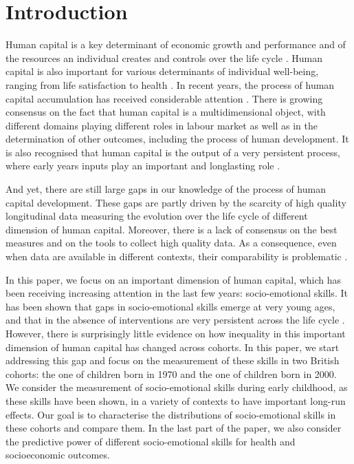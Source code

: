 \section{Introduction}

Human capital is a key determinant of economic growth and performance and of the resources an individual creates and controls over the life cycle \citep{hanushek2008role}. Human capital is also important for various determinants of individual well-being, ranging from life satisfaction to health \citep{conti2019developmental}. In recent years, the process of human capital accumulation has received considerable attention \citep{almond2018childhood}. There is growing consensus on the fact that human capital is a multidimensional object, with different domains playing different roles in labour market as well as in the determination of other outcomes, including the process of human development. It is also recognised that human capital is the output of a very persistent process, where early years inputs play an important and longlasting role \citep{Cunha2010}.

And yet, there are still large gaps in our knowledge of the process of human capital development. These gaps are partly driven by the scarcity of high quality longitudinal data measuring the evolution over the life cycle of different dimension of human capital. Moreover, there is a lack of consensus on the best measures and on the tools to collect high quality data. As a consequence, even when data are available in different contexts, their comparability is problematic \citep{richter2019early}.

In this paper, we focus on an important dimension of human capital, which has been receiving increasing attention in the last few years: socio-emotional skills. It has been shown that gaps in socio-emotional skills emerge at very young ages, and that in the absence of interventions are very persistent across the life cycle \citep{Cunha2006}. However, there is surprisingly little evidence on how inequality in this important dimension of human capital has changed across cohorts. In this paper, we start addressing this gap and focus on the measurement of these skills in two British cohorts: the one of children born in 1970 and the one of children born in 2000. We consider the measurement of socio-emotional skills during early childhood, as these skills have been shown, in a variety of contexts \citep{Almlund2011} to have important long-run effects. Our goal is to characterise the distributions of socio-emotional skills in these cohorts and compare them. In the last part of the paper, we also consider the predictive power of different socio-emotional skills for health and socioeconomic outcomes.

